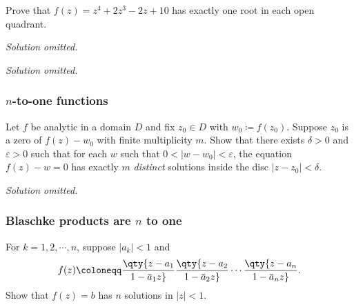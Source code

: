 \begin{problem}[?]

Prove that \(f(z) = z^4 + 2z^3 -2z + 10\) has exactly one root in each
open quadrant.

\end{problem}

\emph{Solution omitted.}

\emph{Solution omitted.}

\hypertarget{n-to-one-functions}{%
\subsubsection{\texorpdfstring{\(n\)-to-one
functions}{n-to-one functions}}\label{n-to-one-functions}}

\begin{problem}[?]

Let \(f\) be analytic in a domain \(D\) and fix \(z_0 \in D\) with
\(w_0 \coloneqq f(z_0)\). Suppose \(z_0\) is a zero of \(f(z) - w_0\)
with finite multiplicity \(m\). Show that there exists \(\delta >0\) and
\({\varepsilon}> 0\) such that for each \(w\) such that
\(0 < {\left\lvert {w-w_0} \right\rvert} < {\varepsilon}\), the equation
\(f(z) - w = 0\) has exactly \(m\) \emph{distinct} solutions inside the
disc \({\left\lvert {z-z_0} \right\rvert} < \delta\).

\end{problem}

\emph{Solution omitted.}

\hypertarget{blaschke-products-are-n-to-one}{%
\subsubsection{\texorpdfstring{Blaschke products are \(n\) to
one}{Blaschke products are n to one}}\label{blaschke-products-are-n-to-one}}

\begin{problem}[?]

For \(k=1,2,\cdots, n\), suppose
\({\left\lvert {a_k} \right\rvert} < 1\) and
\begin{align*}
f(z) \coloneqq\qty{z - a_1 \over 1 - \mkern 1.5mu\overline{\mkern-1.5mua\mkern-1.5mu}\mkern 1.5mu_1 z} \qty{z-a_2 \over 1 - \mkern 1.5mu\overline{\mkern-1.5mua\mkern-1.5mu}\mkern 1.5mu_2 z} \cdots \qty{z - a_n \over 1 - \mkern 1.5mu\overline{\mkern-1.5mua\mkern-1.5mu}\mkern 1.5mu_n z}
.\end{align*}
Show that \(f(z) = b\) has \(n\) solutions in
\({\left\lvert {z} \right\rvert} < 1\).

\end{problem}

